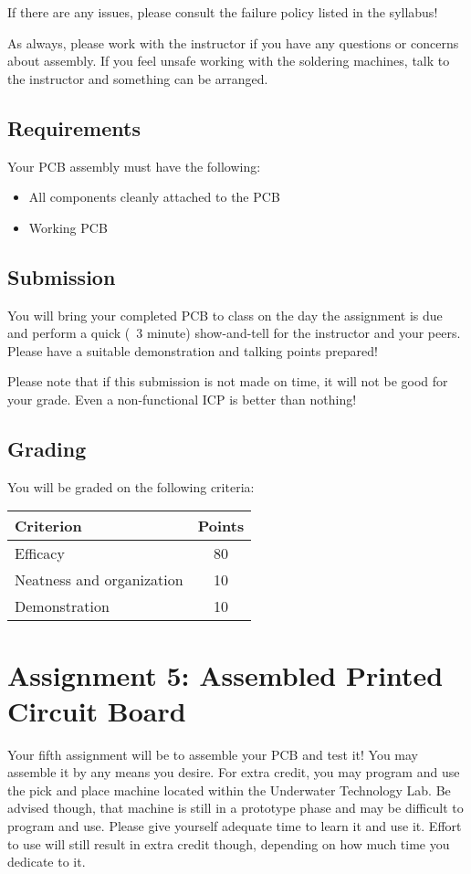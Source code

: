 If there are any issues, please consult the failure policy listed in the syllabus!

As always, please work with the instructor if you have any questions or concerns about assembly.
If you feel unsafe working with the soldering machines, talk to the instructor and something can be arranged.

    \subsection*{Requirements}
    Your PCB assembly must have the following:
    \begin{itemize}
        \item All components cleanly attached to the PCB
        \item Working PCB
    \end{itemize}

    \subsection*{Submission}
    You will bring your completed PCB to class on the day the assignment is due and perform a quick (~3 minute) show-and-tell for the instructor and your peers.
    Please have a suitable demonstration and talking points prepared!

    Please note that if this submission is not made on time, it will not be good for your grade.
    Even a non-functional ICP is better than nothing!

    \subsection*{Grading}
    You will be graded on the following criteria:

    \begin{table}[h!]
        \begin{tabular}{l | c}
            \toprule
            Criterion & Points \\
            \midrule
            Efficacy & 80 \\
            Neatness and organization & 10 \\
            Demonstration & 10 \\
            \bottomrule
        \end{tabular}
    \end{table}

\section*{Assignment 5: Assembled Printed Circuit Board}
Your fifth assignment will be to assemble your PCB and test it!
You may assemble it by any means you desire.
For extra credit, you may program and use the pick and place machine located within the Underwater Technology Lab.
Be advised though, that machine is still in a prototype phase and may be difficult to program and use.
Please give yourself adequate time to learn it and use it.
Effort to use will still result in extra credit though, depending on how much time you dedicate to it.

